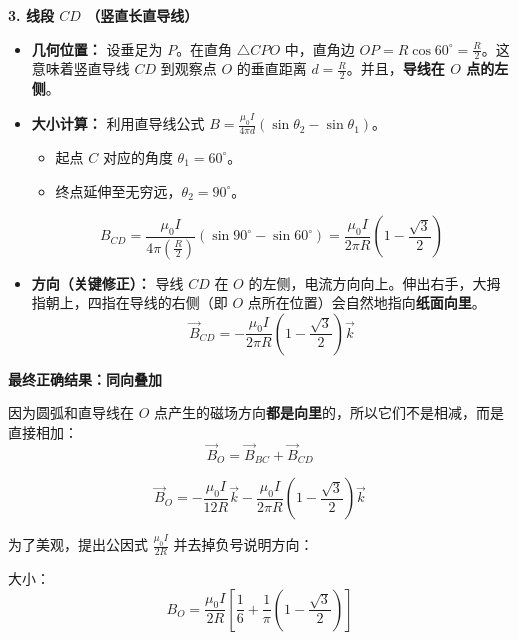 \textbf{3. 线段 $CD$ （竖直长直导线）}
\begin{itemize}
	\item \textbf{几何位置：} 设垂足为 $P$。在直角 $\triangle CPO$ 中，直角边 $OP = R \cos 60^\circ = \frac{R}{2}$。这意味着竖直导线 $CD$ 到观察点 $O$ 的垂直距离 $d = \frac{R}{2}$。并且，\textbf{导线在 $O$ 点的左侧}。
	\item \textbf{大小计算：} 利用直导线公式 $B = \frac{\mu_0 I}{4\pi d}(\sin \theta_2 - \sin \theta_1)$。
	\begin{itemize}
		\item 起点 $C$ 对应的角度 $\theta_1 = 60^\circ$。
		\item 终点延伸至无穷远，$\theta_2 = 90^\circ$。
	\end{itemize}
	\begin{equation}\label{eq:9-12-3}
		B_{CD} = \frac{\mu_0 I}{4\pi (\frac{R}{2})} (\sin 90^\circ - \sin 60^\circ) = \frac{\mu_0 I}{2\pi R} \left( 1 - \frac{\sqrt{3}}{2} \right)
	\end{equation}
	\item \textbf{方向（关键修正）：} 导线 $CD$ 在 $O$ 的左侧，电流方向向上。伸出右手，大拇指朝上，四指在导线的右侧（即 $O$ 点所在位置）会自然地指向\textbf{纸面向里}。
	\begin{equation}\label{eq:9-12-4}
		\vec{B}_{CD} = -\frac{\mu_0 I}{2\pi R} \left( 1 - \frac{\sqrt{3}}{2} \right)\vec{k}
	\end{equation}
\end{itemize}

\textbf{最终正确结果：同向叠加}

因为圆弧和直导线在 $O$ 点产生的磁场方向\textbf{都是向里}的，所以它们不是相减，而是直接相加：
\begin{equation}\label{eq:9-12-5}
	\vec{B}_O = \vec{B}_{BC} + \vec{B}_{CD}
\end{equation}

\begin{equation}\label{eq:9-12-6}
	\vec{B}_O = -\frac{\mu_0 I}{12R}\vec{k} - \frac{\mu_0 I}{2\pi R} \left( 1 - \frac{\sqrt{3}}{2} \right)\vec{k}
\end{equation}

为了美观，提出公因式 $\frac{\mu_0 I}{2R}$ 并去掉负号说明方向：

大小：
\begin{equation}\label{eq:9-12-7}
	B_O = \frac{\mu_0 I}{2R} \left[ \frac{1}{6} + \frac{1}{\pi} \left( 1 - \frac{\sqrt{3}}{2} \right) \right]
\end{equation}

